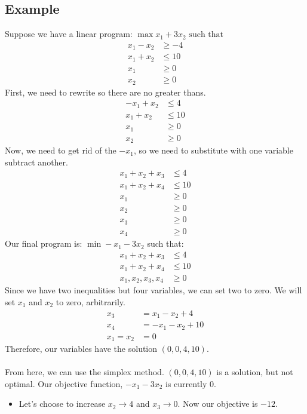 \documentclass[10pt]{article}
\begin{document}
\subsection*{Example}
Suppose we have a linear program:
$\max x_1 + 3x_2 \text{ such that}$
\begin{align*}
    x_1 - x_2 &\geq -4\\
    x_1 + x_2 &\leq 10\\
    x_1 &\geq 0\\
    x_2 &\geq 0
\end{align*}
First, we need to rewrite so there are no greater thans.
\begin{align*}
    -x_1 + x_2 &\leq 4\\
    x_1 + x_2 &\leq 10\\
    x_1 &\geq 0\\
    x_2 &\geq 0
\end{align*}
Now, we need to get rid of the $-x_1$, so we need to substitute with one variable subtract another.
\begin{align*}
    x_1 + x_2 + x_3 &\leq 4\\
    x_1 + x_2 + x_4 &\leq 10\\
    x_1 &\geq 0\\
    x_2 &\geq 0\\ 
    x_3 &\geq 0\\
    x_4 &\geq 0
\end{align*}
Our final program is:
$\min -x_1 - 3x_2$ such that:
\begin{align*}
    x_1 + x_2 + x_3 &\leq 4\\
    x_1 + x_2 + x_4 &\leq 10\\
    x_1, x_2, x_3, x_4 &\geq 0
\end{align*}
Since we have two inequalities but four variables, we can set two to zero.  We will set $x_1$ and $x_2$ to zero, arbitrarily.
\begin{align*}
    x_3 &= x_1 - x_2 + 4\\
    x_4 &= -x_1 - x_2 + 10\\
    x_1 = x_2 &= 0
\end{align*}
Therefore, our variables have the solution $(0, 0, 4, 10)$.\\\\
From here, we can use the simplex method.  $(0, 0, 4, 10)$ is a solution, but not optimal.  Our objective function, $-x_1 - 3x_2$ is currently 0.
\begin{itemize}
	\item Let's choose to increase $x_2 \rightarrow 4$ and $x_3 \rightarrow 0$.  Now our objective is $-12$.
\end{itemize}
\end{document}
